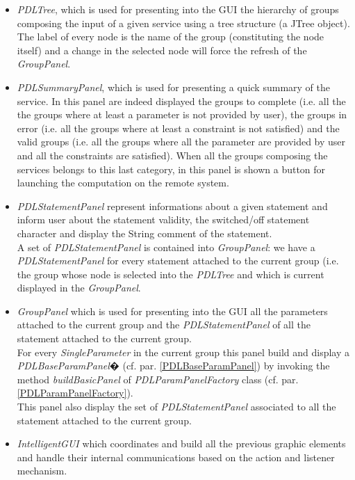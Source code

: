 \documentclass[a4paper,11pt] {ivoa}
\begin{document}
\begin{itemize}
\item {\it PDLTree}, which is used for presenting into the GUI the hierarchy of groups composing the input of a given service using a tree structure (a JTree object). The label of every node is the name of the group (constituting the node itself) and a change in the selected node will force the refresh of the {\it GroupPanel}.
\item {\it PDLSummaryPanel}, which is used for presenting a quick summary of the service. In this panel are indeed displayed the groups to complete (i.e. all the the groups where at least a parameter is not provided by user), the groups in error (i.e. all the groups where at least a constraint is not satisfied) and the valid groups (i.e. all the groups where all the parameter are provided by user and all the constraints are satisfied). When all the groups composing the services belongs to this last category, in this panel is shown a button for launching the computation on the remote system.
\item {\it PDLStatementPanel} represent informations about a given statement and inform user about the statement validity, the switched/off statement character and display the String comment of the statement.\\
A set of {\it PDLStatementPanel} is contained into {\it GroupPanel}: we have a {\it PDLStatementPanel} for every statement attached to the current group (i.e. the group whose node is selected into the {\it PDLTree} and which is current displayed in the {\it GroupPanel}.
\item {\it GroupPanel} which is used for presenting into the GUI all the parameters attached to the current group and the {\it PDLStatementPanel} of all the statement attached to the current group.\\
For every {\it SingleParameter} in the current group this panel build and display a {\it PDLBaseParamPanel}� (cf. par. \ref{PDLBaseParamPanel}) by invoking the method {\it buildBasicPanel} of {\it PDLParamPanelFactory} class (cf. par. \ref{PDLParamPanelFactory}).\\
This panel also display the set of {\it PDLStatementPanel} associated to all the statement attached to the current group.
\item {\it IntelligentGUI} which coordinates and build all the previous graphic elements and handle their internal communications based on the action and listener mechanism. 
\end{itemize}
\end{document}
